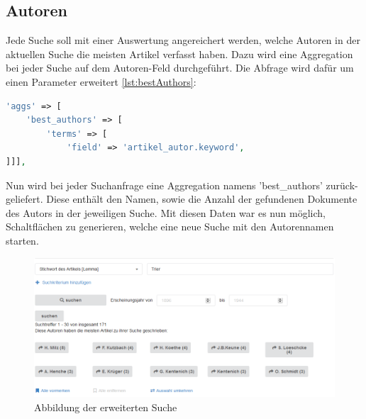 \subsection{Autoren}

Jede Suche soll mit einer Auswertung angereichert werden, welche Autoren in der aktuellen Suche die meisten Artikel verfasst haben. Dazu wird eine Aggregation bei jeder Suche auf dem Autoren-Feld durchgeführt. Die Abfrage wird dafür um einen Parameter erweitert \ref{lst:bestAuthors}:

\begin{lstlisting}[language=PHP, frame=single, label={lst:bestAuthors}, caption=Auschnitt aus der Abfrage zur Aggregation der Autoren,captionpos=b] 
'aggs' => [
    'best_authors' => [
        'terms' => [
            'field' => 'artikel_autor.keyword',
]]],
\end{lstlisting}


Nun wird bei jeder Suchanfrage eine Aggregation namens 'best\_authors' zurück-geliefert. Diese enthält den Namen, sowie die Anzahl der gefundenen Dokumente des Autors in der jeweiligen Suche. 
Mit diesen Daten war es nun möglich, Schaltflächen zu generieren, welche eine neue Suche mit den Autorennamen starten. \cite{ElasticsearchB.V..13.2.2020}


\begin{figure}
	\centering
	\includegraphics[width=1\linewidth]{images/best_authors.png}
	\caption{Abbildung der erweiterten Suche}
	\label{img:erweiterteSuche}
\end{figure}
